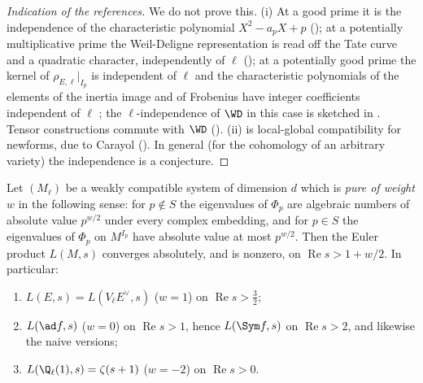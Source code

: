 \begin{proof}[Indication of the references]
We do not prove this. (i) At a good prime it is the independence of the characteristic polynomial $X^2-a_pX+p$ (); at a potentially
multiplicative prime the Weil-Deligne representation is read off the Tate curve and a quadratic character, independently of $\ell$ (); at a
potentially good prime the kernel of $\rho_{E,\ell}|_{I_p}$ is independent of $\ell$ and the characteristic polynomials of the elements of the inertia image and of Frobenius have
integer coefficients independent of $\ell$ \cite[Section 2]{SerreTate68}; the $\ell$-independence of $\WD$ in this case is sketched in . Tensor
constructions commute with $\WD$ (). (ii) is local-global compatibility for newforms, due to Carayol \cite{Carayol86} (). In general
(for the cohomology of an arbitrary variety) the independence is a conjecture.
\end{proof}

\begin{proposition}\label{prop:lfunctions:convergence}
Let $(M_\ell)$ be a weakly compatible system of dimension $d$ which is \emph{pure of weight $w$} in the following sense: for $p\notin S$ the eigenvalues of $\Phi_p$ are
algebraic numbers of absolute value $p^{w/2}$ under every complex embedding, and for $p\in S$ the eigenvalues of $\Phi_p$ on $M^{I_p}$ have absolute value at most
$p^{w/2}$. Then the Euler product $L(M,s)$ converges absolutely, and is nonzero, on $\operatorname{Re}s>1+w/2$. In particular:
\begin{enumerate}[label=(\alph*)]
\item $L(E,s)=L(V_\ell E^\vee,s)$ ($w=1$) on $\operatorname{Re}s>\frac32$;
\item $L(\ad f,s)$ ($w=0$) on $\operatorname{Re}s>1$, hence $L(\Sym f,s)$ on $\operatorname{Re}s>2$, and likewise the naive versions;
\item $L(\Q_\ell(1),s)=\zeta(s+1)$ ($w=-2$) on $\operatorname{Re}s>0$.
\end{enumerate}
\end{proposition}

